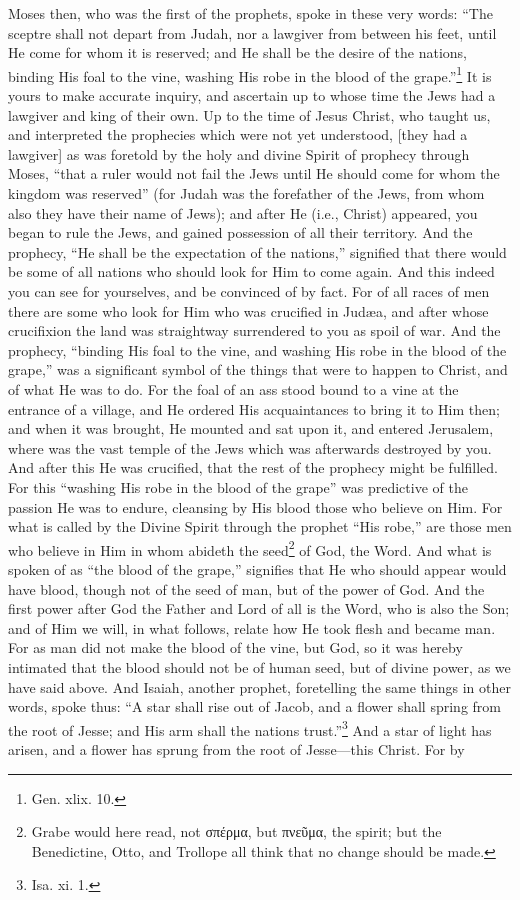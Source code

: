 
Moses then, who was the first of the prophets, spoke in these very words: “The sceptre shall not depart from Judah, nor a lawgiver from between his feet, until He come for whom it is reserved; and He shall be the desire of the nations, binding His foal to the vine, washing His robe in the blood of the grape.”\footnote{Gen. xlix. 10.} It is yours to make accurate inquiry, and ascertain up to whose time the Jews had a lawgiver and king of their own. Up to the time of Jesus Christ, who taught us, and interpreted the prophecies which were not yet understood, [they had a lawgiver] as was foretold by the holy and divine Spirit of prophecy through Moses, “that a ruler would not fail the Jews until He should come for whom the kingdom was reserved” (for Judah was the forefather of the Jews, from whom also they have their name of Jews); and after He (i.e., Christ) appeared, you began to rule the Jews, and gained possession of all their territory. And the prophecy, “He shall be the expectation of the nations,” signified that there would be some of all nations who should look for Him to come again. And this indeed you can see for yourselves, and be convinced of by fact. For of all races of men there are some who look for Him who was crucified in Judæa, and after whose crucifixion the land was straightway surrendered to you as spoil of war. And the prophecy, “binding His foal to the vine, and washing His robe in the blood of the grape,” was a significant symbol of the things that were to happen to Christ, and of what He was to do. For the foal of an ass stood bound to a vine at the entrance of a village, and He ordered His acquaintances to bring it to Him then; and when it was brought, He mounted and sat upon it, and entered Jerusalem, where was the vast temple of the Jews which was afterwards destroyed by you. And after this He was crucified, that the rest of the prophecy might be fulfilled. For this “washing His robe in the blood of the grape” was predictive of the passion He was to endure, cleansing by His blood those who believe on Him. For what is called by the Divine Spirit through the prophet “His robe,” are those men who believe in Him in whom abideth the seed\footnote{Grabe would here read, not \textgreek{σπέρμα}, but \textgreek{πνεῦμα}, the spirit; but the Benedictine, Otto, and Trollope all think that no change should be made.} of God, the Word. And what is spoken of as “the blood of the grape,” signifies that He who should appear would have blood, though not of the seed of man, but of the power of God. And the first power after God the Father and Lord of all is the Word, who is also the Son; and of Him we will, in what follows, relate how He took flesh and became man. For as man did not make the blood of the vine, but God, so it was hereby intimated that the blood should not be of human seed, but of divine  power, as we have said above. And Isaiah, another prophet, foretelling the same things in other words, spoke thus: “A star shall rise out of Jacob, and a flower shall spring from the root of Jesse; and His arm shall the nations trust.''\footnote{Isa. xi. 1.} And a star of light has arisen, and a flower has sprung from the root of Jesse—this Christ. For by 